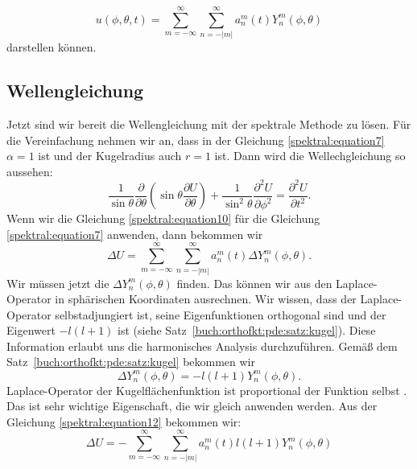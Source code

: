 \begin{equation}
u(\phi,\theta,t) = \sum_{m=-\infty}^{\infty}\sum_{n=-|m|}^{\infty}a_n^m(t)Y_n^m(\phi, \theta)
\label{spektral:equation10}
\end{equation}
darstellen können.

\subsection{Wellengleichung
\label{spektral:subsection:wellengleichung}}
Jetzt sind wir bereit die Wellengleichung mit der spektrale Methode zu lösen.
Für die Vereinfachung nehmen wir an, dass in der Gleichung \eqref{spektral:equation7} $\alpha=1$ ist und der Kugelradius auch $r=1$ ist.
Dann wird die Wellechgleichung so aussehen:
\begin{equation}
\frac{1}{\sin\theta}\frac{\partial}{\partial{\theta}}\left(\sin\theta\frac{\partial{U}}{\partial{\theta}}\right) + \frac{1}{\sin^2\theta}\frac{\partial^2{U}}{\partial{\phi^2}} = \frac{\partial^2{U}}{\partial{t^2}}.
\label{spektral:equation11}
\end{equation}
Wenn wir die Gleichung \eqref{spektral:equation10} für die Gleichung \eqref{spektral:equation7} anwenden, dann bekommen wir
\begin{equation}
\Delta{U} = \sum_{m=-\infty}^{\infty}\sum_{n=-|m|}^{\infty}a_n^m(t)\Delta{Y_n^m(\phi, \theta)}.
\label{spektral:equation12}
\end{equation}
Wir müssen jetzt die $\Delta{Y_n^m(\phi, \theta)}$ finden.
Das können wir aus den Laplace-Operator in sphärischen Koordinaten ausrechnen. Wir wissen, dass der Laplace-Operator selbstadjungiert ist, seine Eigenfunktionen orthogonal sind und der Eigenwert $-l(l+1)$ ist (siehe Satz~\ref{buch:orthofkt:pde:satz:kugel}).
Diese Information erlaubt uns die harmonisches Analysis durchzuführen.
Gemäß dem Satz~\ref{buch:orthofkt:pde:satz:kugel} bekommen wir
\begin{equation}
\Delta{Y_n^m(\phi, \theta)} = -l(l+1)Y_n^m(\phi, \theta).
\label{spektral:equation16}
\end{equation}
Laplace-Operator der Kugelflächenfunktion ist proportional der Funktion selbst \cite[Seite 663]{spektral:DynamicOfTheAtmosphere}. Das ist sehr wichtige Eigenschaft, die wir gleich anwenden werden.
Aus der Gleichung \eqref{spektral:equation12} bekommen wir:
\begin{equation}
\Delta{U} = -\sum_{m=-\infty}^{\infty}\sum_{n=-|m|}^{\infty}a_n^m(t)l(l+1)Y_n^m(\phi, \theta)
\label{spektral:equation17}
\end{equation}
